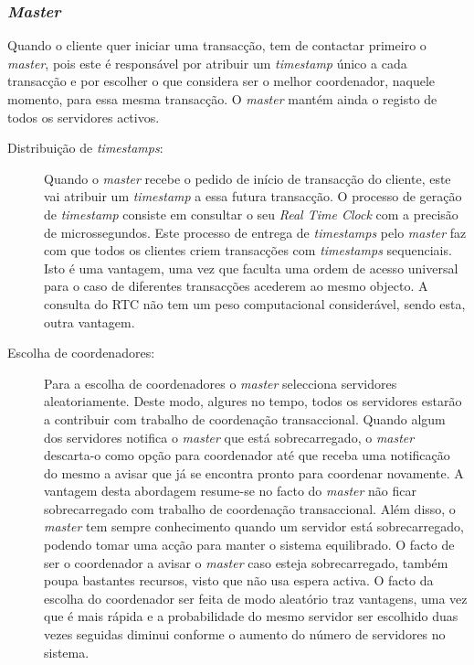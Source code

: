 \subsubsection{\textit{Master}}

Quando o cliente quer iniciar uma transacção, tem de contactar primeiro o \textit{master}, pois este é responsável por atribuir um \textit{timestamp} único a cada transacção e por escolher o que considera ser o melhor coordenador, naquele momento, para essa mesma transacção. O \textit{master} mantém ainda o registo de todos os servidores activos. 

\begin{description}

\item[Distribuição de \textit{timestamps}:]
Quando o \textit{master} recebe o pedido de início de transacção do cliente, este vai atribuir um \textit{timestamp} a essa futura transacção. O processo de geração de \textit{timestamp} consiste em consultar o seu \textit{Real Time Clock} com a precisão de microssegundos.  Este processo de entrega de \textit{timestamps} pelo \textit{master} faz com que todos os clientes criem transacções com \textit{timestamps} sequenciais. Isto é uma vantagem, uma vez que faculta uma ordem de acesso universal para o caso de diferentes transacções acederem ao mesmo objecto. A consulta do RTC não tem um peso computacional considerável, sendo esta, outra vantagem. 

\item[Escolha de coordenadores:]
Para a escolha de coordenadores o \textit{master} selecciona servidores aleatoriamente. Deste modo, algures no tempo, todos os servidores estarão a contribuir com trabalho de coordenação transaccional. Quando algum dos servidores notifica o \textit{master} que está  sobrecarregado, o \textit{master} descarta-o como opção para coordenador até que receba uma notificação do mesmo a avisar que já se encontra pronto para coordenar novamente. A vantagem desta abordagem resume-se no facto do \textit{master} não ficar sobrecarregado com trabalho de coordenação transaccional. Além disso, o \textit{master} tem sempre conhecimento quando um servidor está sobrecarregado, podendo tomar uma acção para manter o sistema equilibrado. O facto de ser o coordenador a avisar o \textit{master} caso esteja sobrecarregado, também poupa bastantes recursos, visto que não usa espera activa. O facto da escolha do coordenador ser feita de modo aleatório traz vantagens, uma vez que é mais rápida e a probabilidade do mesmo servidor ser escolhido duas vezes seguidas diminui conforme o aumento do número de servidores no sistema.


\end{description}
